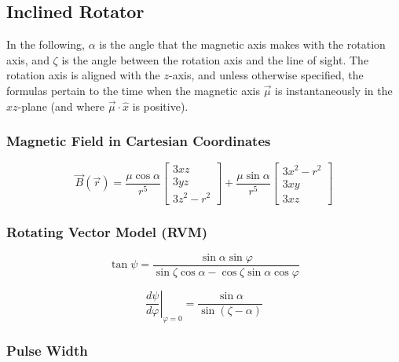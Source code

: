 \documentclass{article}
\newcommand{\phase}{\varphi}
\begin{document}
\subsection{Inclined Rotator}

In the following, $\alpha$ is the angle that the magnetic axis makes with the rotation axis, and $\zeta$ is the angle between the rotation axis and the line of sight.
The rotation axis is aligned with the $z$-axis, and unless otherwise specified, the formulas pertain to the time when the magnetic axis $\vec{\mu}$ is instantaneously in the $xz$-plane (and where $\vec{\mu}\cdot\hat{x}$ is positive).

\subsubsection{Magnetic Field in Cartesian Coordinates}

\begin{equation}
    \vec{B}(\vec{r}) =
    \frac{\mu\cos\alpha}{r^5}\begin{bmatrix}
        3xz \\
        3yz \\
        3z^2 - r^2
    \end{bmatrix} + 
    \frac{\mu\sin\alpha}{r^5}\begin{bmatrix}
        3x^2 - r^2 \\
        3xy \\
        3xz
    \end{bmatrix}
\end{equation}

\subsubsection{Rotating Vector Model (RVM)}

\begin{equation}
    \tan{\psi} = \frac{\sin\alpha \sin\phase}{\sin\zeta\cos\alpha - \cos\zeta\sin\alpha\cos\phase}
\end{equation}

\begin{equation}
    \left.\frac{d\psi}{d\phase}\right|_{\phase=0} = \frac{\sin\alpha}{\sin(\zeta-\alpha)}
\end{equation}

\subsubsection{Pulse Width}
\end{document}
